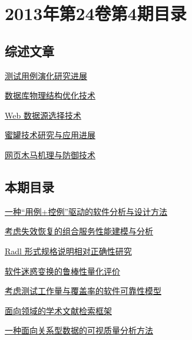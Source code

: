 \documentclass[a4paper]{article}
\begin{document}
\section{\textbf{2013年第24卷第4期目录}}
\subsection{综述文章}
\href{http://www.jos.org.cn/ch/reader/download_pdf.aspx?file_no=4379&year_id=2013&quarter_id=4&falg=1}{测试用例演化研究进展}

\href{http://www.jos.org.cn/ch/reader/download_pdf.aspx?file_no=4355&year_id=2013&quarter_id=4&falg=1}{数据库物理结构优化技术}

\href{http://www.jos.org.cn/ch/reader/download_pdf.aspx?file_no=4374&year_id=2013&quarter_id=4&falg=1}{Web 数据源选择技术}

\href{http://www.jos.org.cn/ch/reader/download_pdf.aspx?file_no=4369&year_id=2013&quarter_id=4&falg=1}{蜜罐技术研究与应用进展}

\href{http://www.jos.org.cn/ch/reader/download_pdf.aspx?file_no=4376&year_id=2013&quarter_id=4&falg=1}{网页木马机理与防御技术}

\subsection{本期目录}
\href{http://www.jos.org.cn/ch/reader/download_pdf.aspx?file_no=4275&year_id=2013&quarter_id=4&falg=1}{一种“用例+控例”驱动的软件分析与设计方法}

\href{http://www.jos.org.cn/ch/reader/download_pdf.aspx?file_no=4272&year_id=2013&quarter_id=4&falg=1}{考虑失效恢复的组合服务性能建模与分析}

\href{http://www.jos.org.cn/ch/reader/download_pdf.aspx?file_no=4260&year_id=2013&quarter_id=4&falg=1}{Radl 形式规格说明相对正确性研究}

\href{http://www.jos.org.cn/ch/reader/download_pdf.aspx?file_no=4234&year_id=2013&quarter_id=4&falg=1}{软件迷惑变换的鲁棒性量化评价}

\href{http://www.jos.org.cn/ch/reader/download_pdf.aspx?file_no=4257&year_id=2013&quarter_id=4&falg=1}{考虑测试工作量与覆盖率的软件可靠性模型}

\href{http://www.jos.org.cn/ch/reader/download_pdf.aspx?file_no=4267&year_id=2013&quarter_id=4&falg=1}{面向领域的学术文献检索框架}

\href{http://www.jos.org.cn/ch/reader/download_pdf.aspx?file_no=4262&year_id=2013&quarter_id=4&falg=1}{一种面向关系型数据的可视质量分析方法}
\end{document}
